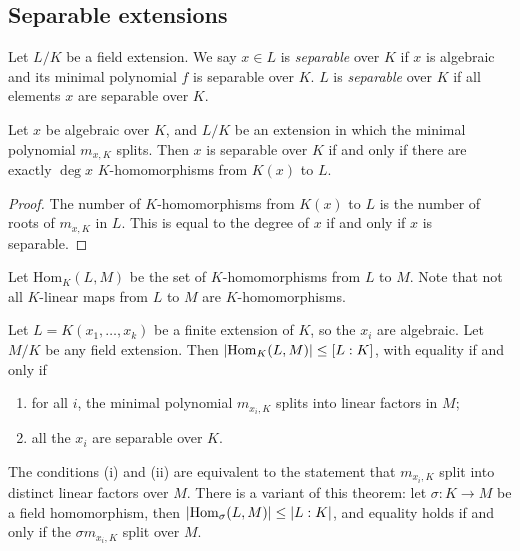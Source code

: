 \subsection{Separable extensions}
\begin{definition}
	Let \( L / K \) be a field extension.
	We say \( x \in L \) is \emph{separable} over \( K \) if \( x \) is algebraic and its minimal polynomial \( f \) is separable over \( K \).
	\( L \) is \emph{separable} over \( K \) if all elements \( x \) are separable over \( K \).
\end{definition}
\begin{theorem}
	Let \( x \) be algebraic over \( K \), and \( L / K \) be an extension in which the minimal polynomial \( m_{x,K} \) splits.
	Then \( x \) is separable over \( K \) if and only if there are exactly \( \deg x \) \( K \)-homomorphisms from \( K(x) \) to \( L \).
\end{theorem}
\begin{proof}
	The number of \( K \)-homomorphisms from \( K(x) \) to \( L \) is the number of roots of \( m_{x,K} \) in \( L \).
	This is equal to the degree of \( x \) if and only if \( x \) is separable.
\end{proof}
Let \( \mathrm{Hom}_K(L,M) \) be the set of \( K \)-homomorphisms from \( L \) to \( M \).
Note that not all \( K \)-linear maps from \( L \) to \( M \) are \( K \)-homomorphisms.
\begin{theorem}
	Let \( L = K(x_1, \dots, x_k) \) be a finite extension of \( K \), so the \( x_i \) are algebraic.
	Let \( M / K \) be any field extension.
	Then \( \abs{\mathrm{Hom}_K(L,M)} \leq [L : K] \), with equality if and only if
	\begin{enumerate}
		\item for all \( i \), the minimal polynomial \( m_{x_i,K} \) splits into linear factors in \( M \);
		\item all the \( x_i \) are separable over \( K \).
	\end{enumerate}
\end{theorem}
\begin{remark}
	The conditions (i) and (ii) are equivalent to the statement that \( m_{x_i,K} \) split into distinct linear factors over \( M \).
	There is a variant of this theorem: let \( \sigma : K \to M \) be a field homomorphism, then \( \abs{\mathrm{Hom}_\sigma(L,M)} \leq \abs{L:K} \), and equality holds if and only if the \( \sigma m_{x_i,K} \) split over \( M \).
\end{remark}
